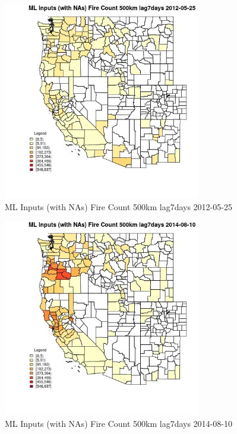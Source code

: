 \begin{figure} 
\centering  
\includegraphics[width=0.77\textwidth]{Code_Outputs/Report_ML_input_PM25_Step4_part_e_de_duplicated_aves_compiled_2019-05-18wNAs_CountyFire_Count_500km_lag7daysMean2012-05-25.jpg} 
\caption{\label{fig:Report_ML_input_PM25_Step4_part_e_de_duplicated_aves_compiled_2019-05-18wNAsCountyFire_Count_500km_lag7daysMean2012-05-25}ML Inputs (with NAs) Fire Count 500km lag7days 2012-05-25} 
\end{figure} 
 

\begin{figure} 
\centering  
\includegraphics[width=0.77\textwidth]{Code_Outputs/Report_ML_input_PM25_Step4_part_e_de_duplicated_aves_compiled_2019-05-18wNAs_CountyFire_Count_500km_lag7daysMean2014-08-10.jpg} 
\caption{\label{fig:Report_ML_input_PM25_Step4_part_e_de_duplicated_aves_compiled_2019-05-18wNAsCountyFire_Count_500km_lag7daysMean2014-08-10}ML Inputs (with NAs) Fire Count 500km lag7days 2014-08-10} 
\end{figure} 
 

